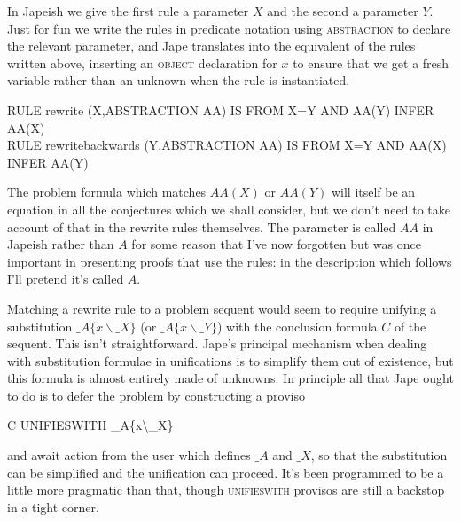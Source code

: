 In Japeish we give the first rule a parameter $X$ and the second a parameter $Y$. Just for fun we write the rules in predicate notation using \textsc{abstraction} to declare the relevant parameter, and Jape translates into the equivalent of the rules written above, inserting an \textsc{object} declaration for $x$ to ensure that we get a fresh variable rather than an unknown when the rule is instantiated.
\begin{japeish}
RULE   rewrite (X,ABSTRACTION AA)           IS FROM X=Y AND AA(Y) INFER AA(X)\\
RULE   rewritebackwards (Y,ABSTRACTION AA)  IS FROM X=Y AND AA(X) INFER AA(Y)
\end{japeish}
The problem formula which matches $AA(X)$ or $AA(Y)$ will itself be an equation in all the conjectures which we shall consider, but we don't need to take account of that in the rewrite rules themselves. The parameter is called $AA$ in Japeish rather than $A$ for some reason that I've now forgotten but was once important in presenting proofs that use the rules: in the description which follows I'll pretend it's called $A$.

Matching a rewrite rule to a problem sequent would seem to require unifying a substitution $\_A\{x\backslash \_X\}$ (or $\_A\{x\backslash \_Y\}$) with the conclusion formula $C$ of the sequent. This isn't straightforward. Jape's principal mechanism when dealing with substitution formulae in unifications is to simplify them out of existence, but this formula is almost entirely made of unknowns. In principle all that Jape ought to do is to defer the problem by constructing a proviso
\begin{japeish}
C UNIFIESWITH \_A\{x\textbackslash\_X\}
\end{japeish}
and await action from the user which defines $\_A$ and $\_X$, so that the substitution can be simplified and the unification can proceed. It's been programmed to be a little more pragmatic than that, though \textsc{unifieswith} provisos are still a backstop in a tight corner.
 

